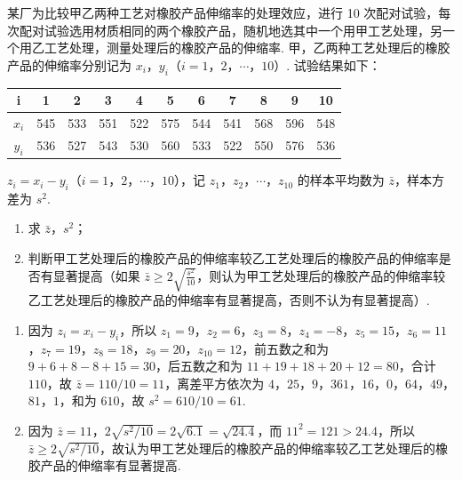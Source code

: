 \begin{problem}
某厂为比较甲乙两种工艺对橡胶产品伸缩率的处理效应，进行 10 次配对试验，每次配对试验选用材质相同的两个橡胶产品，随机地选其中一个用甲工艺处理，另一个用乙工艺处理，测量处理后的橡胶产品的伸缩率. 甲，乙两种工艺处理后的橡胶产品的伸缩率分别记为 \(x_i\)，\(y_i\)（\(i=1\)，\(2\)，\(\cdots\)，\(10\)）. 试验结果如下：

\begin{center}
\begin{tabular}{c|cccccccccc}
i&1&2&3&4&5&6&7&8&9&10\\\hline
\(x_i\)&545&533&551&522&575&544&541&568&596&548\\
\(y_i\)&536&527&543&530&560&533&522&550&576&536
\end{tabular}
\end{center}

\(z_i=x_i-y_i\)（\(i=1\)，\(2\)，\(\cdots\)，\(10\)），记 \(z_1\)，\(z_2\)，\(\cdots\)，\(z_{10}\) 的样本平均数为 \(\bar z\)，样本方差为 \(s^2\).

\begin{enumerate}
\item 求 \(\bar z\)，\(s^2\)；
\item 判断甲工艺处理后的橡胶产品的伸缩率较乙工艺处理后的橡胶产品的伸缩率是否有显著提高（如果 \(\bar z\ge 2\sqrt{\frac{s^2}{10}}\)，则认为甲工艺处理后的橡胶产品的伸缩率较乙工艺处理后的橡胶产品的伸缩率有显著提高，否则不认为有显著提高）.
\end{enumerate}
\end{problem}

\begin{solution}
\begin{enumerate}\item 因为 \(z_{i}=x_{i}-y_{i}\)，所以 \(z_{1}=9\)，\(z_{2}=6\)，\(z_{3}=8\)，\(z_{4}=-8\)，\(z_{5}=15\)，\(z_{6}=11\)，\(z_{7}=19\)，\(z_{8}=18\)，\(z_{9}=20\)，\(z_{10}=12\)，前五数之和为 \(9+6+8-8+15=30\)，后五数之和为 \(11+19+18+20+12=80\)，合计 \(110\)，故 \(\bar z=110/10=11\)，离差平方依次为 \(4\)，\(25\)，\(9\)，\(361\)，\(16\)，\(0\)，\(64\)，\(49\)，\(81\)，\(1\)，和为 \(610\)，故 \(s^{2}=610/10=61\).\item 因为 \(\bar z=11\)，\(2\sqrt{s^{2}/10}=2\sqrt{6.1}=\sqrt{24.4}\)，而 \(11^{2}=121>24.4\)，所以 \(\bar z\ge 2\sqrt{s^{2}/10}\)，故认为甲工艺处理后的橡胶产品的伸缩率较乙工艺处理后的橡胶产品的伸缩率有显著提高.\end{enumerate}
\end{solution}

